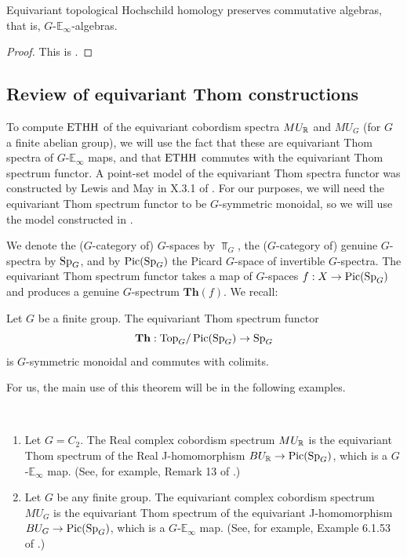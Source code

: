 \begin{proposition}
  Equivariant topological Hochschild homology preserves commutative algebras, that is, $G$-$\mathbb{E}_\infty$-algebras.
\end{proposition}
\begin{proof}
  This is \cite[Proposition 3.5]{CGK25}.
\end{proof}

\subsection{Review of equivariant Thom constructions}
To compute $\mathrm{ETHH}$ of the equivariant cobordism spectra $MU_{\mathbb{R}}$ and $MU_G$ (for $G$ a finite abelian group), we will use the fact that these are equivariant Thom spectra of $G$-$\mathbb{E}_\infty$ maps, and that $\mathrm{ETHH}$ commutes with the equivariant Thom spectrum functor. A point-set model of the equivariant Thom spectra functor was constructed by Lewis and May in X.3.1 of \cite{LMSM}. For our purposes, we will need the equivariant Thom spectrum functor to be $G$-symmetric monoidal, so we will use the model constructed in \cite{HHKWZ24}.

\medskip

We denote the ($G$-category of) $G$-spaces by $\Top _G$, the ($G$-category of) genuine $G$-spectra by $\Spg$, and by $\Pic(\Spg)$ the Picard $G$-space of invertible $G$-spectra. The equivariant Thom spectrum functor takes a map of $G$-spaces $f: X \to \Pic(\Spg)$ and produces a genuine $G$-spectrum $\mathbf{Th}(f)$. We recall:

\begin{theorem}\label{thm-eThom} \cite{HHKWZ24}
    Let $G$ be a finite group. The equivariant Thom spectrum functor 
    $$\mathbf{Th}: \Top _G / \Pic(\Spg) \to \Spg$$ 
    is $G$-symmetric monoidal and commutes with colimits.
\end{theorem}

For us, the main use of this theorem will be in the following examples.

\begin{example}\label{ex-MU}
$\, $

    \begin{enumerate}
        \item Let $G = C_2$. The Real complex cobordism spectrum $MU_{\mathbb{R}}$ is the equivariant Thom spectrum of the Real J-homomorphism $BU_\R \to \Pic(\Spg)$, which is a $G$-$\mathbb{E}_\infty$ map. (See, for example, Remark 13 of \cite{HL}.)
        \item Let $G$ be any finite group. The equivariant complex cobordism spectrum $MU_G$ is the equivariant Thom spectrum of the equivariant J-homomorphism $BU_G \to \Pic(\Spg)$, which is a $G$-$\mathbb{E}_\infty$ map. (See, for example, Example 6.1.53 of \cite{Sch}.)
    \end{enumerate}

\end{example}

